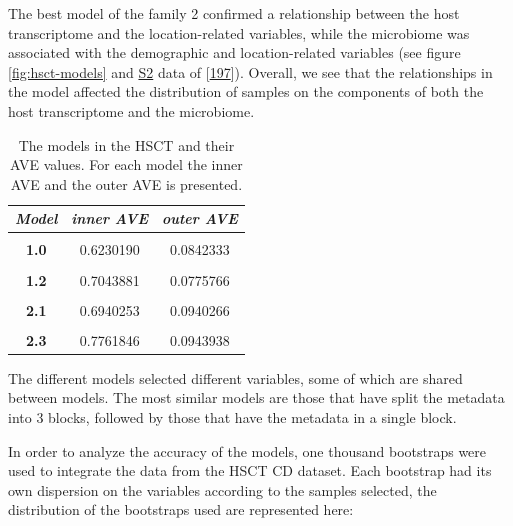\documentclass[
  12pt,
  a4paper,
  twoside,
  openright]{book}
\begin{document}
The best model of the family 2 confirmed a relationship between the host transcriptome and the location-related variables, while the microbiome was associated with the demographic and location-related variables (see figure \ref{fig:hsct-models} and \href{https://journals.plos.org/plosone/article?id=10.1371/journal.pone.0246367\#pone.0246367.s002}{S2} data of {[}\protect\hyperlink{ref-revilla2021}{197}{]}).
Overall, we see that the relationships in the model affected the distribution of samples on the components of both the host transcriptome and the microbiome.

\begin{table}[H]

\caption[The models in the HSCT dataset and their AVE values.]{\label{tab:hsct-models-ave}The models in the HSCT and their AVE values. For each model the inner AVE and the outer AVE is presented.}
\centering
\begin{tabular}[t]{|>{}c|c|>{}c|}
\hline
\em{\textbf{Model}} & \em{\textbf{inner AVE}} & \em{\textbf{outer AVE}}\\
\hline
\textbf{\cellcolor{gray!6}{0.0}} & \cellcolor{gray!6}{0.3999234} & \cellcolor{gray!6}{0.1001689}\\
\hline
\textbf{1.0} & 0.6230190 & 0.0842333\\
\hline
\textbf{\cellcolor{gray!6}{1.1}} & \cellcolor{gray!6}{0.5678189} & \cellcolor{gray!6}{0.0848714}\\
\hline
\textbf{1.2} & 0.7043881 & 0.0775766\\
\hline
\textbf{\cellcolor{gray!6}{2.0}} & \cellcolor{gray!6}{0.2517363} & \cellcolor{gray!6}{0.0982050}\\
\hline
\textbf{2.1} & 0.6940253 & 0.0940266\\
\hline
\textbf{\cellcolor{gray!6}{2.2}} & \cellcolor{gray!6}{0.8187640} & \cellcolor{gray!6}{0.0941628}\\
\hline
\textbf{2.3} & 0.7761846 & 0.0943938\\
\hline
\end{tabular}
\end{table}

The different models selected different variables, some of which are shared between models.
The most similar models are those that have split the metadata into 3 blocks, followed by those that have the metadata in a single block.

In order to analyze the accuracy of the models, one thousand bootstraps were used to integrate the data from the HSCT CD dataset.
Each bootstrap had its own dispersion on the variables according to the samples selected, the distribution of the bootstraps used are represented here:
\end{document}
